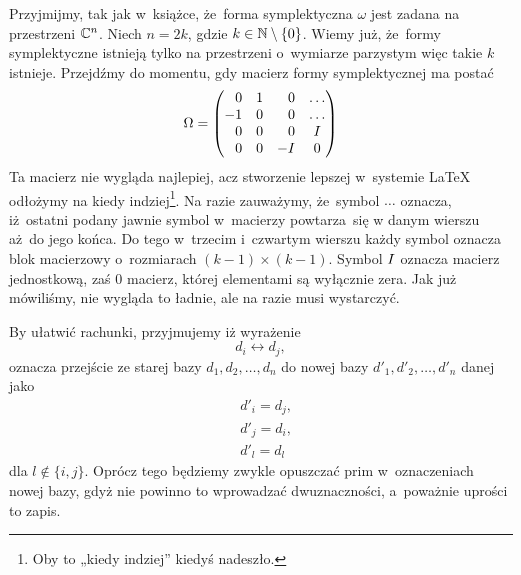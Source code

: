 \documentclass[a4paper,11pt]{article}
\begin{document}
Przyjmijmy, tak jak w~książce, że~forma symplektyczna $\omega$ jest zadana na
przestrzeni $\mathbb{C}^{ n }$. Niech $n = 2k$, gdzie $k \in \mathbb{N} \setminus \{ 0 \}$. Wiemy
już, że~formy symplektyczne istnieją tylko na przestrzeni o~wymiarze
parzystym więc takie $k$ istnieje. Przejdźmy do momentu, gdy macierz formy symplektycznej ma postać
\begin{equation}
  \label{eq:Wojtynski-13}
  \Omega =
  \begin{pmatrix}
    \hphantom{-} 0 & 1 & \hphantom{-} 0 & \ldots \\
    -1 & 0 & \hphantom{-} 0 & \ldots \\
    \hphantom{-} 0 & 0 & \hphantom{-} 0 & I \\
    \hphantom{-} 0 & 0 & -I & 0 \\
  \end{pmatrix}
\end{equation}
Ta macierz nie wygląda najlepiej, acz stworzenie lepszej w~systemie \LaTeX{}
odłożymy na kiedy indziej\footnote{Oby to „kiedy indziej” kiedyś nadeszło.}.
Na razie zauważymy, że~symbol $\ldots$ oznacza, iż~ostatni podany jawnie symbol
w~macierzy powtarza~się w danym wierszu aż~do jego końca. Do tego w~trzecim
i~czwartym wierszu każdy symbol oznacza blok macierzowy o~rozmiarach
$( k - 1 ) \times ( k - 1 )$. Symbol $I$ oznacza macierz jednostkową, zaś
$0$ macierz, której elementami są wyłącznie zera. Jak już mówiliśmy, nie
wygląda to ładnie, ale na razie musi wystarczyć.

By ułatwić rachunki, przyjmujemy iż wyrażenie
\begin{equation}
  \label{eq:Wojtynski-14}
  d_{ i } \leftrightarrow d_{ j },
\end{equation}
oznacza przejście ze starej bazy $d_{ 1 }, d_{ 2 }, \ldots, d_{ n }$ do nowej bazy
$d'_{ 1 }, d'_{ 2 }, \ldots, d'_{ n }$ danej jako
\begin{subequations}
  \begin{align}
    \label{eq:Wojtynski-15-A}
    &d'_{ i } = d_{ j }, \\
    \label{eq:Wojtynski-15-B}
    &d'_{ j } = d_{ i }, \\
    \label{eq:Wojtynski-15-C}
    &d'_{ l } = d_{ l }
  \end{align}
\end{subequations}
dla $l \notin \{ i, j \}$. Oprócz tego będziemy zwykle opuszczać prim
w~oznaczeniach nowej bazy, gdyż nie powinno to wprowadzać dwuznaczności,
a~poważnie uprości to zapis.
\end{document}
